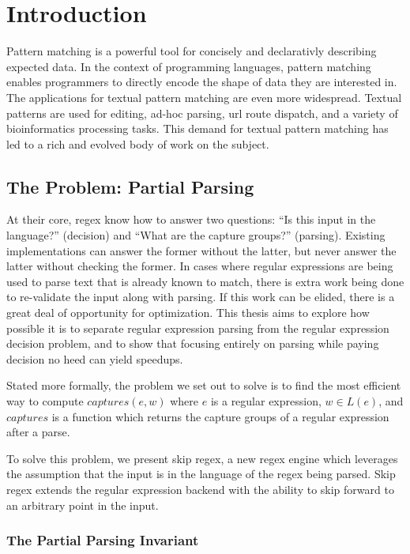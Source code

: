 \chapter{Introduction}
\label{chapter:introduction}

Pattern matching is a powerful tool for concisely and declarativly
describing expected data. In the context of programming languages,
pattern matching enables programmers to directly encode the shape
of data they are interested in. The applications for textual pattern
matching are even more widespread. Textual patterns are used for
editing, ad-hoc parsing, url route dispatch, and a variety of
bioinformatics processing tasks. This demand for textual pattern
matching has led to a rich and evolved body of work on the subject.

\section{The Problem: Partial Parsing}

At their core, regex know how to answer two questions: ``Is this
input in the language?'' (decision) and ``What are the capture
groups?'' (parsing). Existing implementations can answer the former
without the latter, but never answer the latter without checking
the former. In cases where regular expressions are being used to
parse text that is already known to match, there is extra work being done
to re-validate the input along with parsing. If this work can be
elided, there is a great deal of opportunity for optimization.
This thesis aims to explore how possible it is to separate regular
expression parsing from the regular expression decision problem,
and to show that focusing entirely on parsing while paying decision
no heed can yield speedups.

Stated more formally, the problem we set out to solve is to find
the most efficient way to compute $captures(e, w)$ where $e$ is
a regular expression, $w \in L(e)$, and $captures$ is a function
which returns the capture groups of a regular expression after
a parse.

To solve this problem, we present skip regex, a new regex engine
which leverages the assumption that the input is in the language
of the regex being parsed. Skip regex extends the regular expression
backend with the ability to skip forward to an arbitrary point in the
input.

\subsection{The Partial Parsing Invariant}

